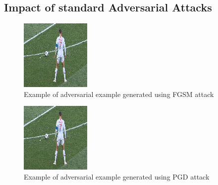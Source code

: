 \documentclass[10pt,twocolumn,letterpaper]{article}
\begin{document}
\subsection{Impact of standard Adversarial Attacks}
\begin{figure}[!ht]
    \centering
    \includegraphics[width=0.5\columnwidth]{./Images/FGSM.png}
    \caption{Example of adversarial example generated using FGSM attack}
\end{figure}
\begin{figure}[!ht]
    \centering
    \includegraphics[width=0.5\columnwidth]{./Images/PGD.png}
    \caption{Example of adversarial example generated using PGD attack}
\end{figure}
\end{document}
